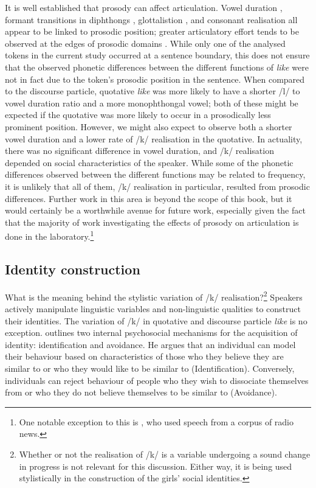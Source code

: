 It is well established that prosody can affect articulation. Vowel duration \citep{edwardsbeckman1992}, formant transitions in diphthongs \citep{woutersmacon2002}, glottalistion \citep{dilleyetal1996}, and consonant realisation \citep{fougeronkeating1997} all appear to be linked to prosodic position; greater articulatory effort tends to be observed at the edges of  prosodic domains \citep{fougeronkeating1997}. While only one of the analysed tokens in the current study occurred at a sentence boundary, this does not ensure that the observed phonetic differences between the different functions of \textit{like} were not in fact due to the token's prosodic position in the sentence. When compared to the discourse particle, quotative \textit{like} was more likely to have a shorter /l/ to vowel duration ratio and a more monophthongal vowel; both of these might be expected if the quotative was more likely to occur in a prosodically less prominent position. However, we might also expect to observe both a shorter vowel duration and a lower rate of /k/ realisation in the quotative. In actuality, there was no significant difference in vowel duration, and /k/ realisation depended on social characteristics of the speaker. While some of the phonetic differences observed between the different functions may be related to frequency, it is unlikely that all of them, /k/ realisation in particular, resulted from prosodic differences. Further work in this area is beyond the scope of this book, but it would certainly be a worthwhile avenue for future work, especially given the fact that the majority of work investigating the effects of prosody on articulation is done in the laboratory.\footnote{One notable exception to this is \citet{coleetal2007}, who used speech from a corpus of radio news.\nocite{coleetal2007}} 

\subsection{Identity construction}\label{sec:idconstruction}

 

What is the meaning behind the stylistic variation of /k/ realisation?\footnote{Whether or not the realisation of /k/ is a variable undergoing a sound change in progress is not relevant for this discussion. Either way, it is being used stylistically in the construction of the girls' social identities.} Speakers actively manipulate linguistic variables and non-linguistic qualities to construct their identities. The variation of /k/ in quotative and discourse particle \textit{like} is no exception. \citet{zwicky1997} outlines two internal psychosocial mechanisms for the acquisition of identity: identification and avoidance. He argues that an individual can model their behaviour based on characteristics of those who they believe they are similar to or who they would like to be similar to (Identification). Conversely, individuals can reject behaviour of people who they wish to dissociate themselves from or who they do not believe themselves to be similar to (Avoidance).

